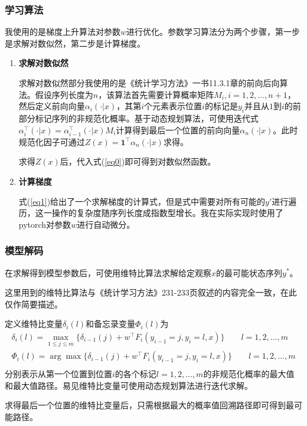 \documentclass[a4paper,UTF8]{article}
\numberwithin{equation}{section}
\begin{document}
\subsubsection{学习算法}
\par 我使用的是梯度上升算法对参数$w$进行优化。参数学习算法分为两个步骤，第一步是求解对数似然，第二步是计算梯度。
\begin{enumerate}
    \item \par\textbf{求解对数似然}
        \par 求解对数似然部分我使用的是《统计学习方法》一书11.3.1章的前向后向算法。假设序列长度为$n$，该算法首先需要计算概率矩阵$M_i, i=1, 2, ..., n+1$，然后定义前向向量$\alpha_i(\cdot|x)$，其第$i$个元素表示位置$i$的标记是$y_i$并且从$1$到$i$的前部分标记序列的非规范化概率。基于动态规划算法，可使用迭代式$\alpha^\top_i(\cdot|x)=\alpha^\top_{i-1} (\cdot|x)M_i$计算得到最后一个位置的前向向量$\alpha_n(\cdot|x)$。此时规范化因子可通过$Z(x)=\mathbf{1}^\top \alpha_n(\cdot|x)$求得。
        
        \par 求得$Z(x)$后，代入式(\ref{eq0})即可得到对数似然函数。
    \item \par\textbf{计算梯度}
        
    \par 式(\ref{eq1})给出了一个求解梯度的计算式，但是式中需要对所有可能的$y'$进行遍历，这一操作的复杂度随序列长度成指数型增长。我在实际实现时使用了pytorch对参数$w$进行自动微分。
\end{enumerate}

\subsubsection{模型解码}
\par 在求解得到模型参数后，可使用维特比算法求解给定观察$x$的最可能状态序列$y^*$。
\par 这里用到的维特比算法与《统计学习方法》231-233页叙述的内容完全一致，在此仅作简要描述。
\par 定义维特比变量$\delta_i(l)$和备忘录变量$\Phi_i(l)$为
$$
\begin{aligned}
    \delta_i(l)=\max_{1\leq j\leq m}\{\delta_{i-1}(j)+w^\top F_i(y_{i-1}=j, y_i=l, x)\}\quad\quad l=1,2,...,m\\
    \Phi_i(l) = \arg\max \{\delta_{i-1}(j)+w^\top F_i(y_{i-1}=j, y_i=l, x)\}\quad\quad l=1,2,...,m\\
\end{aligned}
$$
分别表示从第一个位置到位置$i$的各个标记$l=1,2,...,m$的非规范化概率的最大值和最大值路径。易见维特比变量可使用动态规划算法进行迭代求解。
\par 求得最后一个位置的维特比变量后，只需根据最大的概率值回溯路径即可得到最可能路径。
\end{document}
